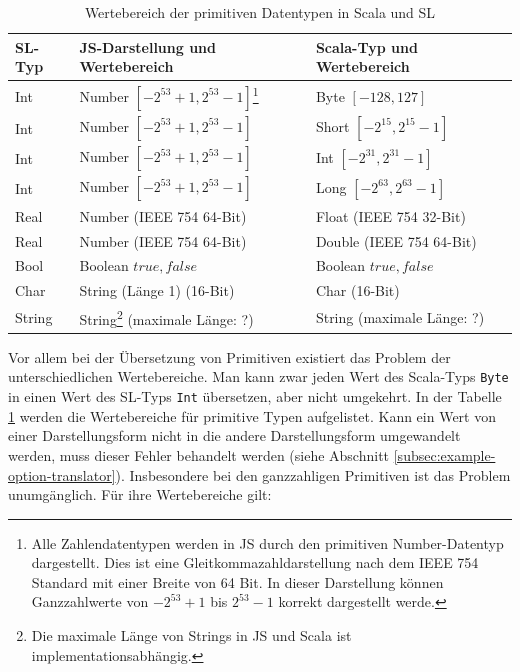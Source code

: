 \documentclass[12pt,bibtotoc]{scrreprt}
\begin{document}
\begin{savenotes}
\begin{table}[h]
\caption{Wertebereich der primitiven Datentypen in Scala und SL\cite[S. 28-30]{Ecma2011}\cite{Oracle2011}}
\centering
\begin{tabular}{lll}
SL-Typ & JS-Darstellung und Wertebereich & Scala-Typ und Wertebereich \\
\midrule
Int    & Number $[-2^{53} + 1, 2^{53} -1]$\footnote{Alle Zahlendatentypen werden in \ac{JS} durch den primitiven Number-Datentyp dargestellt. Dies ist eine Gleitkommazahldarstellung nach dem IEEE 754 Standard mit einer Breite von 64 Bit. In dieser Darstellung können Ganzzahlwerte von $-2^{53} + 1$ bis $2^{53} -1$ korrekt dargestellt werde.}    &  Byte  $[-128, 127]$\\
Int    & Number $[-2^{53} + 1, 2^{53} -1]$ & Short $[-2^{15}, 2^{15}-1]$\\
Int    & Number $[-2^{53} + 1, 2^{53} -1]$ & Int   $[-2^{31}, 2^{31}-1]$\\
Int    & Number $[-2^{53} + 1, 2^{53} -1]$ & Long  $[-2^{63}, 2^{63}-1]$\\
\addlinespace
Real   & Number (IEEE 754 64-Bit)          & Float  (IEEE 754 32-Bit)\\
Real   & Number (IEEE 754 64-Bit)          & Double (IEEE 754 64-Bit)\\
\addlinespace
Bool   & Boolean ${true, false}$           & Boolean ${true, false}$\\
\addlinespace
Char   & String (Länge 1) (16-Bit)         & Char (16-Bit)\\
\addlinespace
String& String\footnote{Die maximale Länge von Strings in \ac{JS} und Scala ist implementationsabhängig.} (maximale Länge: ?)    &  String (maximale Länge: ?)\\
\end{tabular}
\label{tab:primitives-borders}
\end{table}
\end{savenotes}

Vor allem bei der Übersetzung von Primitiven existiert das Problem der unterschiedlichen Wertebereiche. Man kann zwar jeden Wert des Scala-Typs \lstinline!Byte! in einen Wert des SL-Typs \lstinline!Int! übersetzen, aber nicht umgekehrt. In der Tabelle \ref{tab:primitives-borders} werden die Wertebereiche für primitive Typen aufgelistet. Kann ein Wert von einer Darstellungsform nicht in die andere Darstellungsform umgewandelt werden, muss dieser Fehler behandelt werden (siehe Abschnitt \ref{subsec:example-option-translator}). Insbesondere bei den ganzzahligen Primitiven ist das Problem unumgänglich.  Für ihre Wertebereiche gilt:
\end{document}
